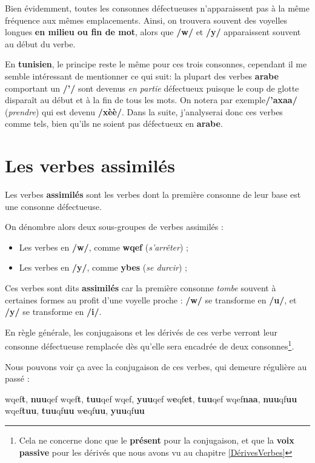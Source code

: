 Bien évidemment, toutes les consonnes défectueuses n'apparaissent pas à la même fréquence aux mêmes emplacements. Ainsi, on trouvera souvent des voyelles longues \textbf{en milieu ou fin de mot}, alors que \textbf{/w/} et \textbf{/y/} apparaissent souvent au début du verbe.

En \textbf{tunisien}, le principe reste le même pour ces trois consonnes, cependant il me semble intéressant de mentionner ce qui suit: la plupart des verbes \textbf{arabe} comportant un \textbf{/'/} sont devenus \textit{en partie} défectueux puisque le coup de glotte disparaît au début et à la fin de tous les mots. On notera par exemple\linebreak \textbf{/'axa\dh a/}  (\textit{prendre}) qui est devenu \textbf{/x\dh èè/}. Dans la suite, j'analyserai donc ces verbes comme tels, bien qu'ils ne soient pas défectueux en \textbf{arabe}.

\section{Les verbes assimilés}
Les verbes \textbf{assimilés} sont les verbes dont la première consonne de leur base est une consonne défectueuse.

On dénombre alors deux sous-groupes de verbes assimilés : 
\begin{itemize}
    \item Les verbes en \textbf{/w/}, comme \textbf{wqef} (\textit{s'arrêter}) ;
    \item Les verbes en \textbf{/y/}, comme \textbf{ybes} (\textit{se durcir}) ;
\end{itemize}

Ces verbes sont dits \textbf{assimilés} car la première consonne \textit{tombe} souvent à certaines formes au profit d'une voyelle proche : \textbf{/w/} se transforme en \textbf{/u/}, et \textbf{/y/} se transforme en \textbf{/i/}.

En règle générale, les conjugaisons et les dérivés de ces verbe verront leur consonne défectueuse remplacée dès qu'elle sera encadrée de deux consonnes\footnote{Cela ne concerne donc que le \textbf{présent} pour la conjugaison, et que la \textbf{voix passive} pour les dérivés que nous avons vu au chapitre \ref{DérivesVerbes}}.

Nous pouvons voir ça avec la conjugaison de ces verbes, qui demeure régulière au passé : 

    {wqef\textbf{t}, \textbf{nuu}qef}
    {wqef\textbf{t}, \textbf{tuu}qef}
    {wqef, \textbf{yuu}qef}
    {w\textbf{e}qf\textbf{et}, \textbf{tuu}qef}
    {wqef\textbf{naa}, \textbf{nuu}qf\textbf{uu}}
    {wqef\textbf{tuu}, \textbf{tuu}qf\textbf{uu}}
    {w\textbf{e}qf\textbf{uu}, \textbf{yuu}qf\textbf{uu}}

